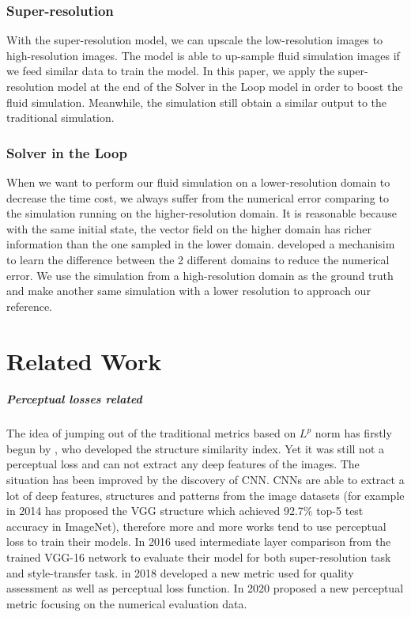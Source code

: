 \documentclass[a4paper,12pt,twoside]{report}
\begin{document}
\subsection{Super-resolution}
With the super-resolution model, we can upscale the low-resolution images to high-resolution images. The model is able to up-sample fluid simulation images if we feed similar data to train the model. In this paper, we apply the super-resolution model at the end of the Solver in the Loop model in order to boost the fluid simulation. Meanwhile, the simulation still obtain a similar output to the traditional simulation.
\subsection{Solver in the Loop}
When we want to perform our fluid simulation on a lower-resolution domain to decrease the time cost, we always suffer from the numerical error comparing to the simulation running on the higher-resolution domain. It is reasonable because with the same initial state, the vector field on the higher domain has richer information than the one sampled in the lower domain. \citeauthor{um2020sol} developed a mechanisim to learn the difference between the 2 different domains to reduce the numerical error.  We use the simulation from a high-resolution domain as the ground truth and make another same simulation with a lower resolution to approach our reference.  




\chapter{Related Work}
\paragraph{Perceptual losses related}The idea of jumping out of the traditional metrics based on $L^p$ norm has firstly begun by \cite{wang2004}, who developed the structure similarity index. Yet it was still not a perceptual loss and can not extract any deep features of the images. The situation has been improved by the discovery of CNN. CNNs are able to extract a lot of deep features, structures and patterns from the image datasets (for example in 2014 \cite{simonyan2014very} has proposed the VGG structure which achieved 92.7\% top-5 test accuracy in ImageNet), therefore more and more  works tend to use perceptual loss to train their models\cite{amirshahi2016, berardino2017, bosse2016, kang2014, kim2017}. In 2016 \cite{johnson2016perceptual} used intermediate layer comparison from the trained VGG-16 network to evaluate their model for both super-resolution task and style-transfer task.  in 2018 \cite{zhang2018perceptual} developed a new metric used for quality assessment as well as perceptual loss function. In 2020 \cite{kohl2020learning} proposed a new perceptual metric focusing on the numerical evaluation data.
\end{document}
